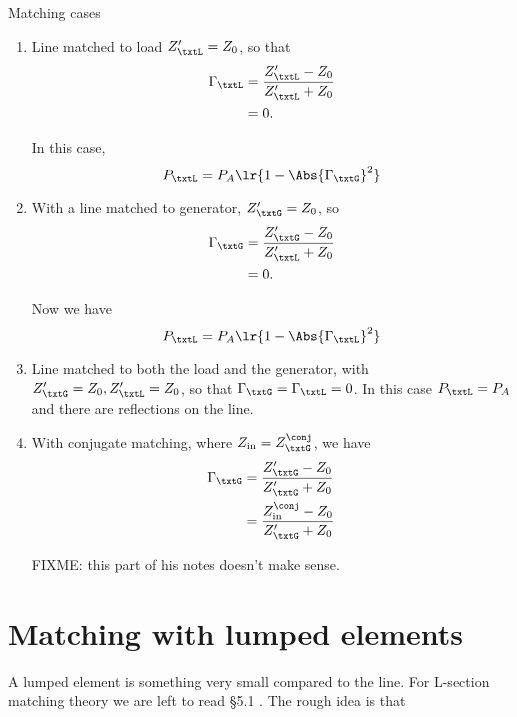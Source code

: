 Matching cases
\begin{enumerate}
\item Line matched to load \( Z_\txtL' = Z_0 \), so that
\begin{equation}\label{eqn:uwavesDeck6LCmatchingCore:80}
\begin{aligned}
\Gamma_\txtL
&= \frac{Z_\txtL' - Z_0}{Z_\txtL' + Z_0}
\\ &= 0.
\end{aligned}
\end{equation}

In this case,
\begin{equation}\label{eqn:uwavesDeck6LCmatchingCore:100}
P_\txtL = P_A \lr{ 1 - \Abs{\Gamma_\txtG}^2 }
\end{equation}
\item With a line matched to generator, \( Z_\txtG' = Z_0 \), so
\begin{equation}\label{eqn:uwavesDeck6LCmatchingCore:120}
\begin{aligned}
\Gamma_\txtG
&= \frac{Z_\txtG' - Z_0}{Z_\txtL' + Z_0}
\\ &= 0.
\end{aligned}
\end{equation}

Now we have
\begin{equation}\label{eqn:uwavesDeck6LCmatchingCore:140}
P_\txtL = P_A \lr{ 1 - \Abs{\Gamma_\txtL}^2 }
\end{equation}
\item Line matched to both the load and the generator, with \( Z_\txtG' = Z_0, Z_\txtL' = Z_0 \),
so that \( \Gamma_\txtG = \Gamma_\txtL = 0 \).
In this case \( P_\txtL = P_A \) and there are reflections on the line.
\item With conjugate matching, where \( Z_{\textrm{in}} = Z_\txtG^\conj \), we have
\begin{equation}\label{eqn:uwavesDeck6LCmatchingCore:160}
\begin{aligned}
\Gamma_\txtG
&= \frac{Z_\txtG' - Z_0}{Z_\txtG' + Z_0}
\\ &= \frac{Z_{\textrm{in}}^\conj - Z_0}{Z_\txtG' + Z_0}
\end{aligned}
\end{equation}

FIXME: this part of his notes doesn't make sense.
\end{enumerate}

\section{Matching with lumped elements}
A lumped element is something very small compared to the line.  For L-section matching theory we are left to read \S 5.1 \citep{pozar2009microwave}.  The rough idea is that

